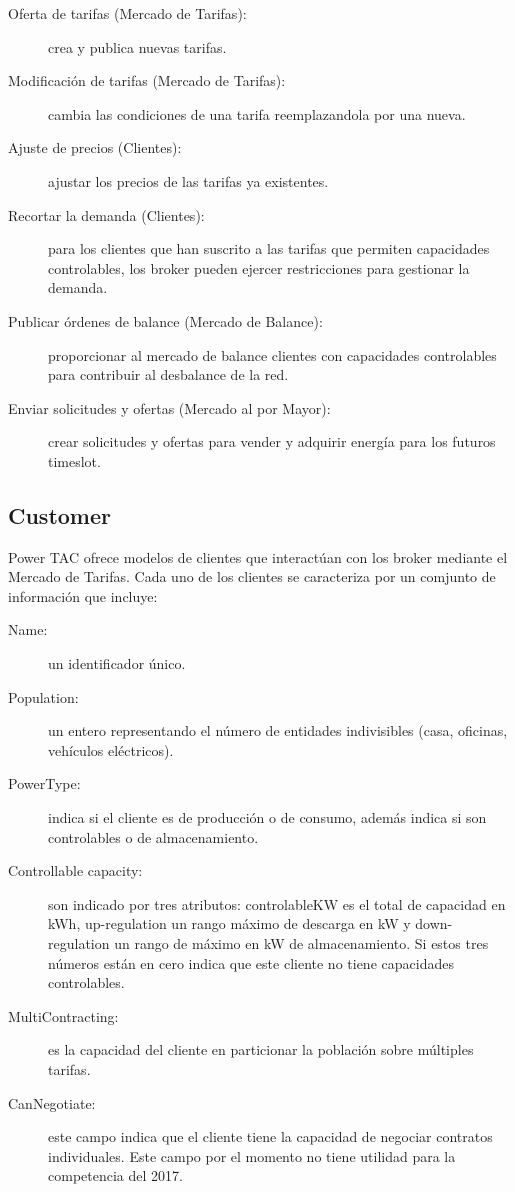 \begin{description}
	\item [Oferta de tarifas (Mercado de Tarifas):] crea y publica nuevas tarifas.
	\item [Modificación de tarifas (Mercado de Tarifas):]  cambia las condiciones de una tarifa reemplazandola por una nueva.
	\item [Ajuste de precios (Clientes):] ajustar los precios de las tarifas ya existentes.
	\item [Recortar la demanda (Clientes):] para los clientes que han suscrito a las tarifas que permiten capacidades controlables, los broker pueden ejercer restricciones para gestionar la demanda.
	\item [Publicar órdenes de balance (Mercado de Balance):] proporcionar al mercado de balance clientes con capacidades controlables para contribuir al desbalance de la red.
	\item [Enviar solicitudes y ofertas (Mercado al por Mayor):]  crear solicitudes y ofertas para vender y adquirir energía para los futuros timeslot.
\end{description}
\subsection{Customer}

Power TAC ofrece modelos de clientes que interactúan con los broker mediante el Mercado de Tarifas. Cada uno de los clientes se caracteriza por un comjunto de información que incluye:

\begin{description}
	\item[Name:] un identificador único.
	\item[Population:] un entero representando el número de entidades indivisibles (casa, oficinas, vehículos eléctricos).
	\item[PowerType:] indica si el cliente es de producción o de consumo, además indica si  son controlables o de almacenamiento.
	\item[Controllable capacity:] son indicado por tres atributos: controlableKW  es el total de capacidad en kWh, up-regulation un rango máximo de descarga en kW y down-regulation un rango de máximo en kW de almacenamiento. Si estos tres números están en cero indica que este cliente no tiene capacidades controlables.
	\item[MultiContracting:] es la capacidad del cliente en particionar la población sobre múltiples tarifas.
	\item[CanNegotiate:] este campo indica que el cliente tiene la capacidad de negociar contratos individuales. Este campo por el momento no tiene utilidad para la competencia del 2017.
\end{description}

